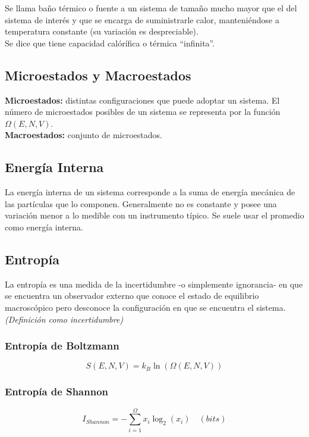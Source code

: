 Se llama baño térmico o fuente a un sistema de tamaño mucho mayor que el del sistema de interés y que se encarga de suministrarle calor, manteniéndose a temperatura constante (su variación es despreciable).\\
Se dice que tiene capacidad calórífica o térmica ``infinita''.

\subsection{Microestados y Macroestados}

\textbf{Microestados:} distintas configuraciones que puede adoptar un sistema. El número de microestados posibles de un sistema se representa por la función $\Omega(E, N, V)$.\\

\textbf{Macroestados:} conjunto de microestados.

\subsection{Energía Interna}

La energía interna de un sistema corresponde a la suma de energía mecánica de las partículas que lo componen. Generalmente no es constante y posee una variación menor a lo medible con un instrumento típico. Se suele usar el promedio como energía interna.

\subsection{Entropía}

La entropía es una medida de la incertidumbre -o simplemente ignorancia- en que se encuentra un observador externo que conoce el estado de equilibrio macroscópico pero desconoce la conﬁguración en que se encuentra el sistema. \textit{(Definición como incertidumbre)}

\subsubsection{Entropía de Boltzmann}

\[S(E,N,V) = k_B\ln{(\Omega(E,N,V))}\]

\subsubsection{Entropía de Shannon}
\[I_{Shannon} = - \sum_{i=1}^\Omega x_i\log_2(x_i) \quad (bits)\]

